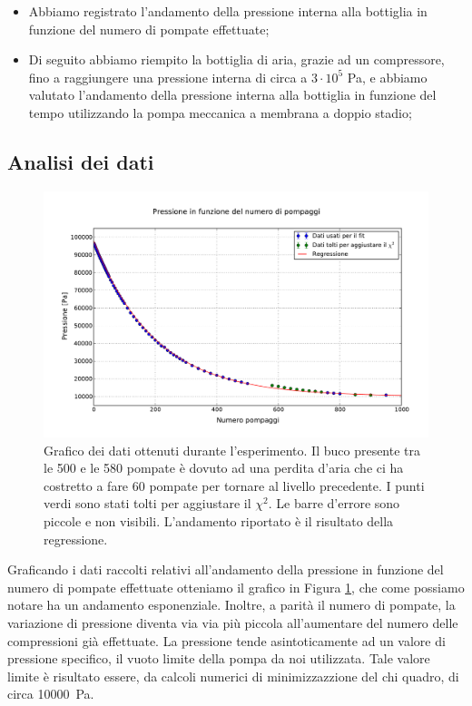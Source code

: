 \begin{itemize}
	\item{Abbiamo registrato l'andamento della pressione interna alla bottiglia in funzione del numero di pompate effettuate;}
	\item{Di seguito abbiamo riempito la bottiglia di aria, grazie ad un compressore, fino a raggiungere una pressione
	interna di circa a $3 \cdot 10^5$ \si{\pascal}, e abbiamo valutato l'andamento della pressione interna alla bottiglia
	in funzione del tempo utilizzando la pompa meccanica a membrana a doppio stadio;}
\end{itemize}

\subsection{Analisi dei dati}

\begin{figure}[t]
    \includegraphics[width=160mm]{graph.pdf}
    \caption{Grafico dei dati ottenuti durante l'esperimento. Il buco presente tra le 500 e le 580 pompate è dovuto ad una perdita d'aria
    che ci ha costretto a fare 60 pompate per tornare al livello precedente. I punti verdi sono stati tolti per aggiustare il $\chi^2$.
    Le barre d'errore sono piccole e non visibili. L'andamento riportato è il risultato della regressione.}
    \label{fig:graph1}
\end{figure}

Graficando i dati raccolti relativi all'andamento della pressione in funzione del numero di pompate effettuate otteniamo
il grafico in Figura \ref{fig:graph1}, che come possiamo notare ha un andamento esponenziale. Inoltre, a parità
il numero di pompate, la variazione di pressione diventa via via più piccola all'aumentare del numero delle
compressioni già effettuate. La pressione tende asintoticamente ad un valore di pressione specifico, il vuoto limite della pompa
da noi utilizzata. Tale valore limite è risultato essere, da calcoli numerici di minimizzazzione del chi quadro, di circa \SI{10000}{\pascal}.

